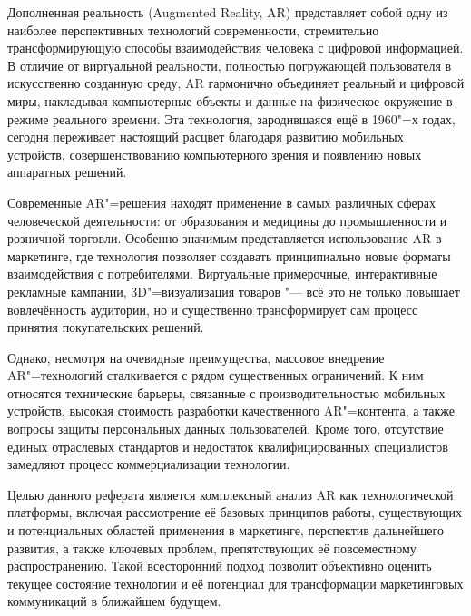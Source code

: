 
Дополненная реальность (Augmented Reality, AR) представляет собой одну из наиболее перспективных технологий современности, стремительно трансформирующую способы взаимодействия человека с цифровой информацией. В отличие от виртуальной реальности, полностью погружающей пользователя в искусственно созданную среду, AR гармонично объединяет реальный и цифровой миры, накладывая компьютерные объекты и данные на физическое окружение в режиме реального времени. Эта технология, зародившаяся ещё в 1960"=х годах, сегодня переживает настоящий расцвет благодаря развитию мобильных устройств, совершенствованию компьютерного зрения и появлению новых аппаратных решений.

Современные AR"=решения находят применение в самых различных сферах человеческой деятельности: от образования и медицины до промышленности и розничной торговли. Особенно значимым представляется использование AR в маркетинге, где технология позволяет создавать принципиально новые форматы взаимодействия с потребителями. Виртуальные примерочные, интерактивные рекламные кампании, 3D"=визуализация товаров "--- всё это не только повышает вовлечённость аудитории, но и существенно трансформирует сам процесс принятия покупательских решений.

Однако, несмотря на очевидные преимущества, массовое внедрение AR"=технологий сталкивается с рядом существенных ограничений. К ним относятся технические барьеры, связанные с производительностью мобильных устройств, высокая стоимость разработки качественного AR"=контента, а также вопросы защиты персональных данных пользователей. Кроме того, отсутствие единых отраслевых стандартов и недостаток квалифицированных специалистов замедляют процесс коммерциализации технологии.

Целью данного реферата является комплексный анализ AR как технологической платформы, включая рассмотрение её базовых принципов работы, существующих и потенциальных областей применения в маркетинге, перспектив дальнейшего развития, а также ключевых проблем, препятствующих её повсеместному распространению. Такой всесторонний подход позволит объективно оценить текущее состояние технологии и её потенциал для трансформации маркетинговых коммуникаций в ближайшем будущем.
